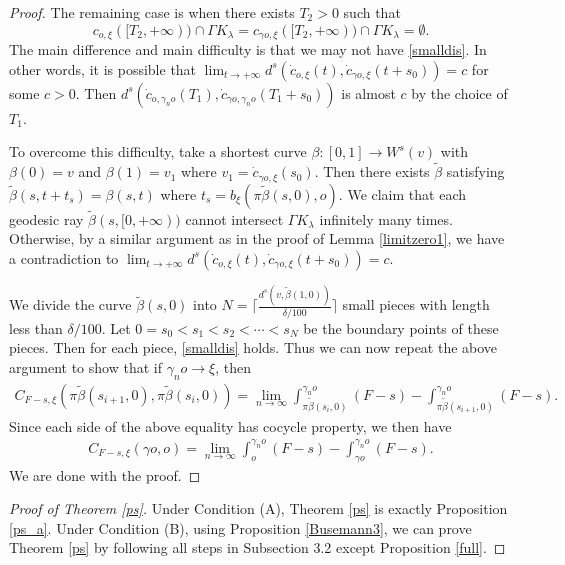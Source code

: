 \documentclass[11pt]{amsart}
\theoremstyle{definition}
\newtheorem{remark}[theorem]{Remark}
\def\b{\beta}
\def\c{\gamma}   \def\C{\Gamma}
\def\d{\delta}   %
\def\l{\lambda}   \def\L{\Lambda}
\begin{document}
\begin{proof}
The remaining case is when there exists $T_2>0$ such that 
$$c_{o,\xi}([T_2, +\infty))\cap \C K_\l=c_{\c o,\xi}([T_2, +\infty))\cap \C K_\l=\emptyset.$$
The main difference and main difficulty is that we may not have \eqref{smalldis}. In other words, it is possible that $\lim_{t\to +\infty}d^s(\dot c_{o,\xi}(t), \dot c_{\c o,\xi}(t+s_0))=c$ for some $c>0$. Then $d^s(\dot c_{o,\c_n o}(T_1),\dot c_{\c o,\c_n o}(T_1+s_0))$ is almost $c$ by the choice of $T_1$.

To overcome this difficulty, take a shortest curve $\beta: [0,1]\to W^s(v)$ with $\beta(0)=v$ and $\b(1)=v_1$ where $v_1=\dot c_{\c o,\xi}(s_0)$. Then there exists $\tilde{\b}$ satisfying $\tilde{\b}(s,t+t_s)=\b(s,t)$ where $t_s=b_{\xi}(\pi \tilde{\b}(s, 0),o)$. We claim that each geodesic ray $\tilde{\b}(s,[0,+\infty))$ cannot intersect $\C K_\l$ infinitely many times. Otherwise, by a similar argument as in the proof of Lemma \ref{limitzero1}, we have a contradiction to $\lim_{t\to +\infty}d^s(\dot c_{o,\xi}(t), \dot c_{\c o,\xi}(t+s_0))=c$.

We divide the curve $\tilde{\b}(s,0)$ into $N=\lceil\frac{d^s(v,\tilde\b(1,0))}{\d/100}\rceil$ small pieces with length less than $\d/100$. Let $0=s_0<s_1<s_2<\cdots<s_N$ be the boundary points of these pieces. Then for each piece, \eqref{smalldis} holds. Thus we can now repeat the above argument to show that if $\c_no\to \xi$, then
\begin{equation*}
\begin{aligned}
C_{F-s,\xi}(\pi\tilde{\b}(s_{i+1}, 0),\pi\tilde{\b}(s_{i}, 0))=\lim_{n\to \infty }\int_{\pi\tilde{\b}(s_{i}, 0)}^{\c_n o}(F-s)-\int_{\pi\tilde{\b}(s_{i+1}, 0)}^{\c_n o}(F-s).
\end{aligned}
\end{equation*}
Since each side of the above equality has cocycle property, we then have 
\begin{equation*}
\begin{aligned}
C_{F-s,\xi}(\c o,o)=\lim_{n\to \infty }\int_{o}^{\c_n o}(F-s)-\int_{\c o}^{\c_n o}(F-s).
\end{aligned}
\end{equation*}
We are done with the proof.
\end{proof}

\begin{proof}[Proof of Theorem \ref{ps}]
Under Condition (A), Theorem \ref{ps} is exactly Proposition  \ref{ps_a}. Under Condition (B), using Proposition \ref{Busemann3}, we can prove Theorem \ref{ps} by following all steps in Subsection 3.2 except Proposition \ref{full}.  
\end{proof}
\end{document}

